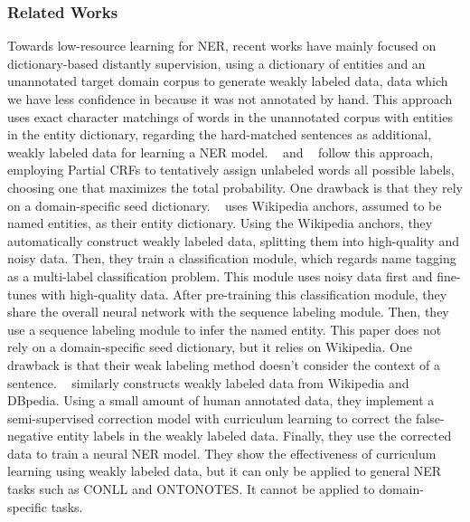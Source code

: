 \subsubsection{Related Works}
Towards low-resource learning for NER,
recent works have mainly focused on dictionary-based distantly supervision, using a dictionary of entities and an unannotated target domain corpus to generate weakly labeled data, data which we have less confidence in because it was not annotated by hand. This approach uses exact character matchings of words in the unannotated corpus with entities in the entity dictionary, regarding the hard-matched sentences as additional, weakly labeled data for learning a NER model. 
~\cite{autoner} and ~\cite{yangner} follow this approach, employing Partial CRFs to tentatively assign unlabeled words all possible labels, choosing one that maximizes the total probability. One drawback is that they rely on a domain-specific seed dictionary. 
~\cite{weakcrf} uses Wikipedia anchors, assumed to be named entities, as their entity dictionary. Using the Wikipedia anchors, they automatically construct weakly labeled data, splitting them into high-quality and noisy data. Then, they train a classification module, which regards name tagging as a multi-label classification problem. This module uses noisy data first and fine-tunes with high-quality data. After pre-training this classification module, they share the overall neural network with the sequence labeling module. Then, they use a sequence labeling module to infer the named entity. This paper does not rely on a domain-specific seed dictionary, but it relies on Wikipedia. One drawback is that their weak labeling method doesn't consider the context of a sentence.
~\cite{opencorrection} similarly constructs weakly labeled data from Wikipedia and DBpedia. Using a small amount of human annotated data, they implement a semi-supervised correction model with curriculum learning to correct the false-negative entity labels in the weakly labeled data. Finally, they use the corrected data to train a neural NER model. They show the effectiveness of curriculum learning using weakly labeled data, but it can only be applied to general NER tasks such as CONLL and ONTONOTES. It cannot be applied to domain-specific tasks.

